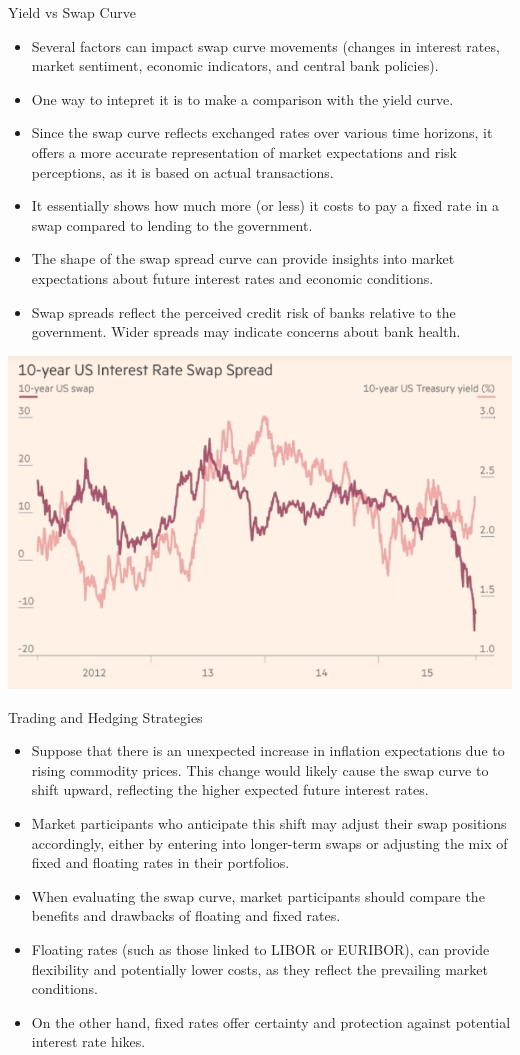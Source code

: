 \documentclass{beamer}
\begin{document}
\begin{frame}{Yield vs Swap Curve} 
\begin{itemize}
\item Several factors can impact swap curve movements (changes in interest rates, market sentiment, economic indicators, and central bank policies).
\item One way to intepret it is to make a comparison with the yield curve.
\item Since the swap curve reflects exchanged rates over various time horizons, it offers a more accurate representation of market expectations and risk perceptions, as it is based on actual transactions.

\item It essentially shows how much more (or less) it costs to pay a fixed rate in a swap compared to lending to the government.
\item The shape of the swap spread curve can provide insights into market expectations about future interest rates and economic conditions.
\item Swap spreads reflect the perceived credit risk of banks relative to the government. Wider spreads may indicate concerns about bank health. 
\end{itemize}
\begin{center}
	\includegraphics[width=0.4\linewidth]{images/swap_spread}
\end{center}
\end{frame}

\begin{frame}{Trading and Hedging Strategies}
\begin{itemize}
\item Suppose that there is an unexpected increase in inflation expectations due to rising commodity prices. This change would likely cause the swap curve to shift upward, reflecting the higher expected future interest rates. 
\item Market participants who anticipate this shift may adjust their swap positions accordingly, either by entering into longer-term swaps or adjusting the mix of fixed and floating rates in their portfolios.
\item When evaluating the swap curve, market participants should compare the benefits and drawbacks of floating and fixed rates. 
\item Floating rates (such as those linked to LIBOR or EURIBOR), can provide flexibility and potentially lower costs, as they reflect the prevailing market conditions. 
\item On the other hand, fixed rates offer certainty and protection against potential interest rate hikes. 
\end{itemize}
\end{frame}
\end{document}
